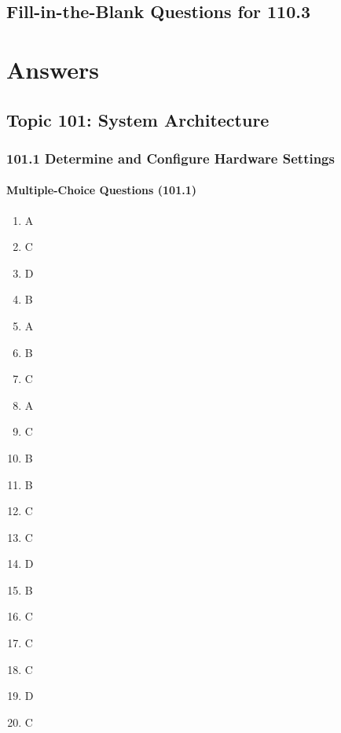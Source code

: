 \documentclass[a4paper]{report}
\begin{document}
\newpage
\section*{Fill-in-the-Blank Questions for 110.3}

\clearpage

\chapter*{Answers} 

\section*{Topic 101: System Architecture}



\subsection*{101.1 Determine and Configure Hardware Settings}
\subsubsection*{Multiple-Choice Questions (101.1)}
\begin{enumerate}[1.]
    \item A
    \item C
    \item D
    \item B
    \item A
    \item B
    \item C
    \item A
    \item C
    \item B
    \item B
    \item C
    \item C
    \item D
    \item B
    \item C
    \item C
    \item C
    \item D
    \item C
    \end{enumerate}
\end{document}
